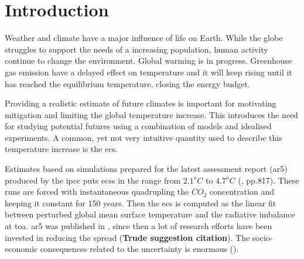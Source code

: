 \chapter{Introduction} \label{ch:introduction}
Weather and climate have a major influence of life on Earth. While the globe struggles to support the needs of a increasing population, human activity continue to change the environment. %
Global warming is in progress. Greenhouse gas emission have a delayed effect on temperature and it will keep rising until it has reached the equilibrium temperature, closing the energy budget. 

Providing a realistic estimate of future climates is important for motivating mitigation and limiting the global temperature increase. 
This introduces the need for studying potential futures using a combination of models and idealised experiments. A common, yet not very intuitive quantity used to describe this temperature increase is the \acrfull{ecs}. 

Estimates based on %
simulations prepared for the latest assessment report (\acrshort{ar5}) produced by the \acrfull{ipcc} puts \acrshort{ecs}s in the range from $2.1^oC$ to $4.7^oC$ (\cite{IPCC_CH9_climate_models}, pp.817). These runs are forced with instantaneous quadrupling the $CO_2$ concentration %
and keeping it constant for 150 years. Then the \acrshort{ecs} is computed as the linear fit between perturbed global mean surface temperature and the radiative imbalance at \acrfull{toa}. 
\acrshort{ar5} was published in \citeyear{IPCC_entire_book}, since then a lot of research efforts have been invested in reducing the spread (\textbf{Trude suggestion citation}). The socio-economic consequences related to the uncertainty is enormous (\cite{bony2015}). 


